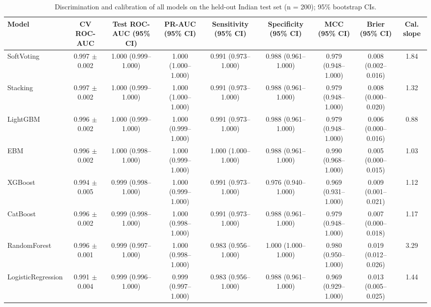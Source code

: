 \begin{table}[t]
\centering
\small
\caption{Discrimination and calibration of all models on the held-out Indian test set (n = 200); 95\% bootstrap CIs.}
\label{tab:models}
\begin{tabular}{lcccccccc}
\toprule
Model & CV ROC-AUC & Test ROC-AUC (95\% CI) & PR-AUC (95\% CI) & Sensitivity (95\% CI) & Specificity (95\% CI) & MCC (95\% CI) & Brier (95\% CI) & Cal. slope \\
\midrule
SoftVoting & 0.997 $\pm$ 0.002 & 1.000 (0.999--1.000) & 1.000 (1.000--1.000) & 0.991 (0.973--1.000) & 0.988 (0.961--1.000) & 0.979 (0.948--1.000) & 0.008 (0.002--0.016) & 1.84 \\
Stacking & 0.997 $\pm$ 0.002 & 1.000 (0.999--1.000) & 1.000 (1.000--1.000) & 0.991 (0.973--1.000) & 0.988 (0.961--1.000) & 0.979 (0.948--1.000) & 0.008 (0.000--0.020) & 1.32 \\
LightGBM & 0.996 $\pm$ 0.002 & 1.000 (0.999--1.000) & 1.000 (0.999--1.000) & 0.991 (0.973--1.000) & 0.988 (0.961--1.000) & 0.979 (0.948--1.000) & 0.006 (0.000--0.016) & 0.88 \\
EBM & 0.996 $\pm$ 0.002 & 1.000 (0.998--1.000) & 1.000 (0.999--1.000) & 1.000 (1.000--1.000) & 0.988 (0.961--1.000) & 0.990 (0.968--1.000) & 0.005 (0.000--0.015) & 1.03 \\
XGBoost & 0.994 $\pm$ 0.005 & 0.999 (0.998--1.000) & 1.000 (0.999--1.000) & 0.991 (0.973--1.000) & 0.976 (0.940--1.000) & 0.969 (0.931--1.000) & 0.009 (0.001--0.021) & 1.12 \\
CatBoost & 0.996 $\pm$ 0.002 & 0.999 (0.998--1.000) & 1.000 (0.998--1.000) & 0.991 (0.973--1.000) & 0.988 (0.961--1.000) & 0.979 (0.948--1.000) & 0.007 (0.000--0.018) & 1.17 \\
RandomForest & 0.996 $\pm$ 0.001 & 0.999 (0.997--1.000) & 1.000 (0.998--1.000) & 0.983 (0.956--1.000) & 1.000 (1.000--1.000) & 0.980 (0.950--1.000) & 0.019 (0.012--0.026) & 3.29 \\
LogisticRegression & 0.991 $\pm$ 0.004 & 0.999 (0.996--1.000) & 0.999 (0.997--1.000) & 0.983 (0.956--1.000) & 0.988 (0.961--1.000) & 0.969 (0.929--1.000) & 0.013 (0.005--0.025) & 1.44 \\
\bottomrule
\end{tabular}
\end{table}
